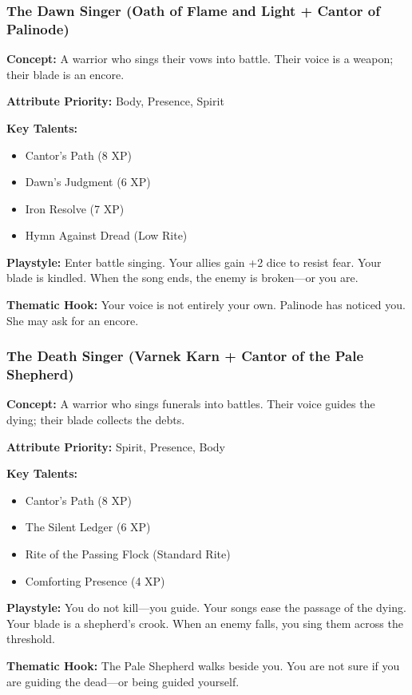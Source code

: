 \subsubsection{The Dawn Singer (Oath of Flame and Light + Cantor of Palinode)}

\textbf{Concept:} A warrior who sings their vows into battle. Their voice is a weapon; their blade is an encore.

\textbf{Attribute Priority:} Body, Presence, Spirit

\textbf{Key Talents:}
\begin{itemize}
\item Cantor's Path (8 XP)
\item Dawn's Judgment (6 XP)
\item Iron Resolve (7 XP)
\item Hymn Against Dread (Low Rite)
\end{itemize}

\textbf{Playstyle:} Enter battle singing. Your allies gain +2 dice to resist fear. Your blade is kindled. When the song ends, the enemy is broken—or you are.

\textbf{Thematic Hook:} Your voice is not entirely your own. Palinode has noticed you. She may ask for an encore.

\subsubsection{The Death Singer (Varnek Karn + Cantor of the Pale Shepherd)}

\textbf{Concept:} A warrior who sings funerals into battles. Their voice guides the dying; their blade collects the debts.

\textbf{Attribute Priority:} Spirit, Presence, Body

\textbf{Key Talents:}
\begin{itemize}
\item Cantor's Path (8 XP)
\item The Silent Ledger (6 XP)
\item Rite of the Passing Flock (Standard Rite)
\item Comforting Presence (4 XP)
\end{itemize}

\textbf{Playstyle:} You do not kill—you guide. Your songs ease the passage of the dying. Your blade is a shepherd's crook. When an enemy falls, you sing them across the threshold.

\textbf{Thematic Hook:} The Pale Shepherd walks beside you. You are not sure if you are guiding the dead—or being guided yourself.

